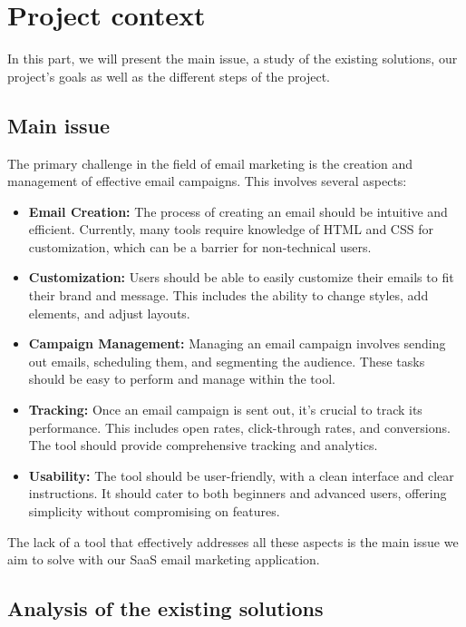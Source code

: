 \section{Project context}

In this part, we will present the main issue, a study of the existing solutions, our project’s
goals as well as the different steps of the project.

\subsection{Main issue}
The primary challenge in the field of email marketing is the creation and management of effective email campaigns. This involves several aspects:

\begin{itemize}
\item \textbf{Email Creation:} The process of creating an email should be intuitive and efficient. Currently, many tools require knowledge of HTML and CSS for customization, which can be a barrier for non-technical users.

\item \textbf{Customization:} Users should be able to easily customize their emails to fit their brand and message. This includes the ability to change styles, add elements, and adjust layouts.

\item \textbf{Campaign Management:} Managing an email campaign involves sending out emails, scheduling them, and segmenting the audience. These tasks should be easy to perform and manage within the tool.

\item \textbf{Tracking:} Once an email campaign is sent out, it's crucial to track its performance. This includes open rates, click-through rates, and conversions. The tool should provide comprehensive tracking and analytics.

\item \textbf{Usability:} The tool should be user-friendly, with a clean interface and clear instructions. It should cater to both beginners and advanced users, offering simplicity without compromising on features.
\end{itemize}

The lack of a tool that effectively addresses all these aspects is the main issue we aim to solve with our SaaS email marketing application.



\subsection{Analysis of the existing solutions}

